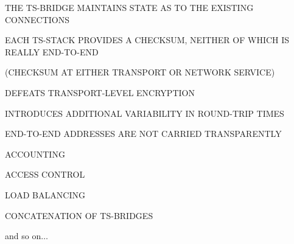 

\begin{bwslide}

\begin{nrtc}
\item	THE TS-BRIDGE MAINTAINS STATE AS TO THE EXISTING CONNECTIONS

\item	EACH TS-STACK PROVIDES A CHECKSUM,
	NEITHER OF WHICH IS REALLY END-TO-END
    \begin{nrtc}
    \item	(CHECKSUM AT EITHER TRANSPORT OR NETWORK SERVICE)
    \end{nrtc}

\item	DEFEATS TRANSPORT-LEVEL ENCRYPTION

\item	INTRODUCES ADDITIONAL VARIABILITY IN ROUND-TRIP TIMES

\item	END-TO-END ADDRESSES ARE NOT CARRIED TRANSPARENTLY
\end{nrtc}
\end{bwslide}


\begin{bwslide}

\begin{nrtc}
\item	ACCOUNTING

\item	ACCESS CONTROL

\item	LOAD BALANCING

\item	CONCATENATION OF TS-BRIDGES

\item	and so on$\ldots$
\end{nrtc}
\end{bwslide}


